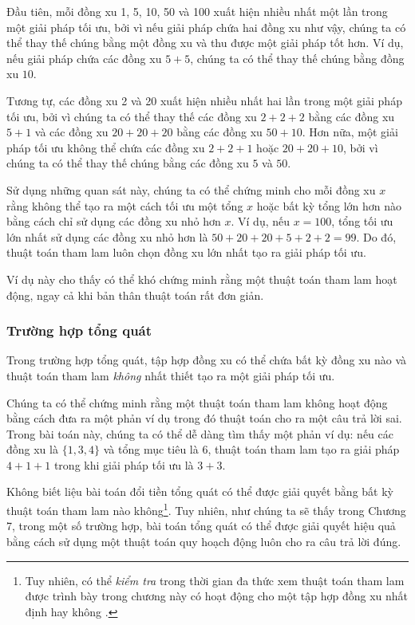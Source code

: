 Đầu tiên, mỗi đồng xu 1, 5, 10, 50 và 100 xuất hiện
nhiều nhất một lần trong một giải pháp tối ưu,
bởi vì nếu giải pháp
chứa hai đồng xu như vậy,
chúng ta có thể thay thế chúng bằng một đồng xu và
thu được một giải pháp tốt hơn.
Ví dụ, nếu giải pháp chứa
các đồng xu $5+5$, chúng ta có thể thay thế chúng bằng đồng xu $10$.

Tương tự, các đồng xu 2 và 20 xuất hiện
nhiều nhất hai lần trong một giải pháp tối ưu,
bởi vì chúng ta có thể thay thế
các đồng xu $2+2+2$ bằng các đồng xu $5+1$ và
các đồng xu $20+20+20$ bằng các đồng xu $50+10$.
Hơn nữa, một giải pháp tối ưu không thể chứa
các đồng xu $2+2+1$ hoặc $20+20+10$,
bởi vì chúng ta có thể thay thế chúng bằng các đồng xu $5$ và $50$.

Sử dụng những quan sát này,
chúng ta có thể chứng minh cho mỗi đồng xu $x$ rằng
không thể tạo ra một cách tối ưu
một tổng $x$ hoặc bất kỳ tổng lớn hơn nào bằng cách chỉ sử dụng các đồng xu
nhỏ hơn $x$.
Ví dụ, nếu $x=100$, tổng tối ưu lớn nhất
sử dụng các đồng xu nhỏ hơn là $50+20+20+5+2+2=99$.
Do đó, thuật toán tham lam luôn chọn
đồng xu lớn nhất tạo ra giải pháp tối ưu.

Ví dụ này cho thấy có thể khó
chứng minh rằng một thuật toán tham lam hoạt động,
ngay cả khi bản thân thuật toán rất đơn giản.

\subsubsection{Trường hợp tổng quát}

Trong trường hợp tổng quát, tập hợp đồng xu có thể chứa bất kỳ đồng xu nào
và thuật toán tham lam \emph{không} nhất thiết tạo ra
một giải pháp tối ưu.

Chúng ta có thể chứng minh rằng một thuật toán tham lam không hoạt động
bằng cách đưa ra một phản ví dụ
trong đó thuật toán cho ra một câu trả lời sai.
Trong bài toán này, chúng ta có thể dễ dàng tìm thấy một phản ví dụ:
nếu các đồng xu là $\{1,3,4\}$ và tổng mục tiêu
là 6, thuật toán tham lam tạo ra giải pháp
$4+1+1$ trong khi giải pháp tối ưu là $3+3$.

Không biết liệu bài toán đổi tiền tổng quát
có thể được giải quyết bằng bất kỳ thuật toán tham lam nào không\footnote{Tuy nhiên, có thể
\emph{kiểm tra} trong thời gian đa thức
xem thuật toán tham lam được trình bày trong chương này có hoạt động cho
một tập hợp đồng xu nhất định hay không \cite{pea05}.}.
Tuy nhiên, như chúng ta sẽ thấy trong Chương 7,
trong một số trường hợp,
bài toán tổng quát có thể được giải quyết hiệu quả bằng cách sử dụng một thuật toán
quy hoạch động luôn cho ra
câu trả lời đúng.

